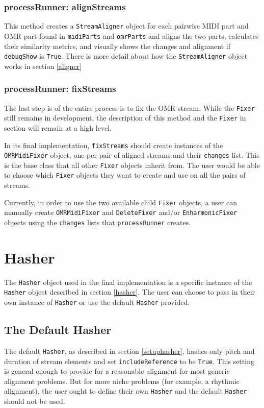 \subsubsection{processRunner: alignStreams}
This method creates a \texttt{StreamAligner} object for each pairwise MIDI part and OMR part found in \texttt{midiParts} and \texttt{omrParts} and aligns the two parts, calculates their similarity metrics, and visually shows the changes and alignment if \texttt{debugShow} is \texttt{True}. There is more detail about how the \texttt{StreamAligner} object works in section \ref{aligner}

\subsubsection{processRunner: fixStreams}\label{processrunner2}
The last step is of the entire process is to fix the OMR stream. While the \texttt{Fixer} still remains in development, the description of this method and the \texttt{Fixer} in section \label{fixer} will remain at a high level. 

In its final implementation, \texttt{fixStreams} should create instances of the \texttt{OMRMidiFixer} object, one per pair of aligned streams and their \texttt{changes} list. This is the base class that all other \texttt{Fixer} objects inherit from. The user would be able to choose which \texttt{Fixer} objects they want to create and use on all the pairs of streams. 

Currently, in order to use the two available child \texttt{Fixer} objects, a user can manually create \texttt{OMRMidiFixer} and \texttt{DeleteFixer} and/or \texttt{EnharmonicFixer} objects using the \texttt{changes} lists that \texttt{processRunner} creates.

\section{Hasher}
The \texttt{Hasher} object used in the final implementation is a specific instance of the \texttt{Hasher} object described in section \ref{hasher}. The user can choose to pass in their own instance of \texttt{Hasher} or use the default \texttt{Hasher} provided.

\subsection{The Default Hasher}
The default \texttt{Hasher}, as described in section \ref{setuphasher}, hashes only pitch and duration of stream elements and set \texttt{includeReference} to be \texttt{True}. This setting is general enough to provide for a reasonable alignment for most generic alignment problems. But for more niche problems (for example, a rhythmic alignment), the user ought to define their own \texttt{Hasher} and the default \texttt{Hasher} should not be used. 

